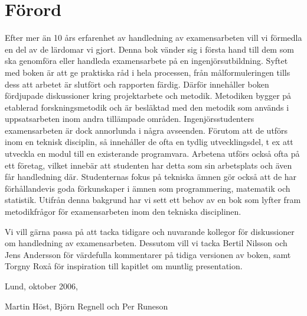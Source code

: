\section{Förord}\label{fuxf6rord}

Efter mer än 10 års erfarenhet av handledning av examensarbeten vill vi
förmedla en del av de lärdomar vi gjort. Denna bok vänder sig i första
hand till dem som ska genomföra eller handleda examensarbete på en
ingenjörsutbildning. Syftet med boken är att ge praktiska råd i hela
processen, från målformuleringen tills dess att arbetet är slutfört och
rapporten färdig. Därför innehåller boken fördjupade diskussioner kring
projektarbete och metodik. Metodiken bygger på etablerad
forskningsmetodik och är besläktad med den metodik som används i
uppsatsarbeten inom andra tillämpade områden. Ingenjörsstudenters
examensarbeten är dock annorlunda i några avseenden. Förutom att de
utförs inom en teknisk disciplin, så innehåller de ofta en tydlig
utvecklingsdel, t ex att utveckla en modul till en existerande
programvara. Arbetena utförs också ofta på ett företag, vilket innebär
att studenten har detta som sin arbetsplats och även får handledning
där. Studenternas fokus på tekniska ämnen gör också att de har
förhållandevis goda förkunskaper i ämnen som programmering, matematik
och statistik. Utifrån denna bakgrund har vi sett ett behov av en bok
som lyfter fram metodikfrågor för examensarbeten inom den tekniska
disciplinen.

Vi vill gärna passa på att tacka tidigare och nuvarande kollegor för
diskussioner om handledning av examensarbeten. Dessutom vill vi tacka
Bertil Nilsson och Jens Andersson för värdefulla kommentarer på tidiga
versionen av boken, samt Torgny Roxå för inspiration till kapitlet om
muntlig presentation.

Lund, oktober 2006,

Martin Höst, Björn Regnell och Per Runeson
